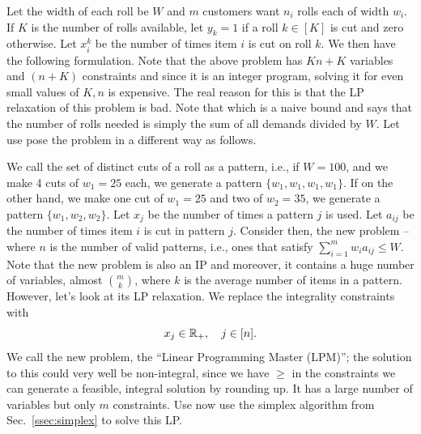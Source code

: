 \documentclass[letterpaper, 10pt, twocolumn, reqno]{amsart}
\begin{document}
Let the width of each roll be $W$ and $m$ customers want $n_i$ rolls each of width $w_i$. If $K$ is the number of rolls available, let $y_k = 1$ if a roll $k \in [K]$ is cut and zero otherwise. Let $x_i^k$ be the number of times item $i$ is cut on roll $k$. We then have the following formulation.
Note that the above problem has $Kn + K$ variables and $(n+K)$ constraints and since it is an integer program, solving it for even small values of $K, n$ is expensive. The real reason for this is that the LP relaxation of this problem is bad. Note that
which is a naive bound and says that the number of rolls needed is simply the sum of all demands divided by $W$. Let use pose the problem in a different way as follows.

We call the set of distinct cuts of a roll as a pattern, i.e., if $W=100$, and we make 4 cuts of $w_1 = 25$ each, we generate a pattern $\{ w_1, w_1, w_1, w_1 \}$. If on the other hand, we make one cut of $w_1 =25$ and two of $w_2 = 35$, we generate a pattern $\{ w_1, w_2, w_2 \}$. Let $x_j$ be the number of times a pattern $j$ is used. Let $a_{ij}$ be the number of times item $i$ is cut in pattern $j$. Consider then, the new problem --
where $n$ is the number of valid patterns, i.e., ones that satisfy $\sum_{i=1}^m w_i a_{ij} \leq W$. Note that the new problem is also an IP and moreover, it contains a huge number of variables, almost $m \choose k$, where $k$ is the average number of items in a pattern. However, let's look at its LP relaxation. We replace the integrality constraints with
$$
x_j \in \mathbb{R}_+,\quad j \in [n].
$$
We call the new problem, the ``Linear Programming Master (LPM)''; the solution to this could very well be non-integral, since we have $\geq$ in the constraints we can generate a feasible, integral solution by rounding up. It has a large number of variables but only $m$ constraints. Use now use the simplex algorithm from Sec.~\ref{ssec:simplex} to solve this LP.
\end{document}
